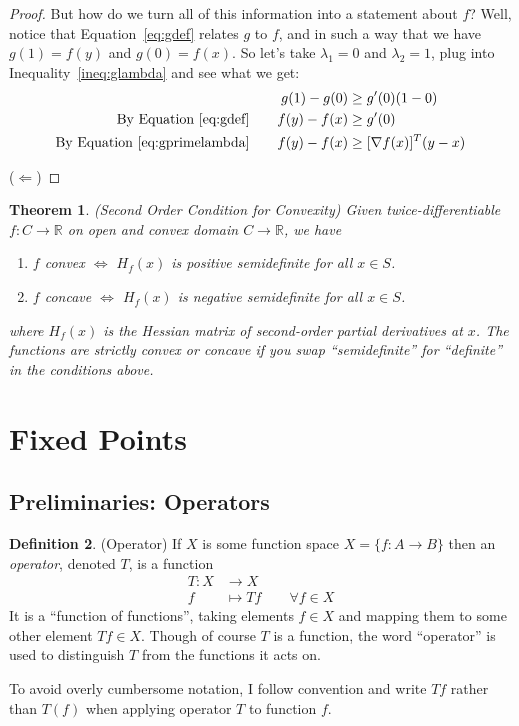 \documentclass[12pt]{article}
\numberwithin{equation}{section} %
\theoremstyle{plain}
\newtheorem{thm}{Theorem}[section]
\theoremstyle{definition}
\newtheorem{defn}[thm]{Definition}
\theoremstyle{remark}
\newcommand{\R}{\mathbb{R}}
\begin{document}
\begin{proof}
But how do we turn all of this information into a statement about $f$?
Well, notice that Equation~\ref{eq:gdef} relates $g$ to $f$, and in such
a way that we have $g(1)=f(y)$ and $g(0)=f(x)$. So let's take
$\lambda_1=0$ and $\lambda_2=1$, plug into Inequality~\ref{ineq:glambda}
and see what we get:
\begin{align*}
  g(1) - g(0)
  &\geq g'(0)(1-0) \\
  \text{By Equation~\ref{eq:gdef}}\qquad
  f(y)-f(x)
  &\geq g'(0) \\
  \text{By Equation~\ref{eq:gprimelambda}}\qquad
  f(y)-f(x)
  &\geq [\nabla f(x)]^T (y-x) \\
\end{align*}

($\Leftarrow$)
\end{proof}

\begin{thm}{(Second Order Condition for Convexity)}
Given twice-differentiable $f:C\rightarrow\R$ on open and convex domain
$C\rightarrow\R$, we have
\begin{enumerate}
  \item $f$ convex $\iff$ $H_f(x)$ is positive semidefinite for all
    $x\in S$.
  \item $f$ concave $\iff$ $H_f(x)$ is negative semidefinite for all
    $x\in S$.
\end{enumerate}
where $H_f(x)$ is the Hessian matrix of second-order partial derivatives
at $x$. The functions are \emph{strictly} convex or concave if you
swap ``semidefinite'' for ``definite'' in the conditions above.
\end{thm}

\clearpage
\section{Fixed Points}

\subsection{Preliminaries: Operators}

\begin{defn}{(Operator)}
If $X$ is some function space
$X = \{f:A\rightarrow B\}$
then an \emph{operator}, denoted $T$, is a function
\begin{align*}
  T:X&\rightarrow X \\
  f&\mapsto Tf
  \qquad \forall f\in X
\end{align*}
It is a ``function of functions'', taking elements $f\in X$ and mapping
them to some other element $Tf\in X$. Though of course $T$ is a
function, the word ``operator'' is used to distinguish $T$ from the
functions it acts on.

To avoid overly cumbersome notation, I follow convention and write $Tf$
rather than $T(f)$ when applying operator $T$ to function $f$.
\end{defn}
\end{document}
